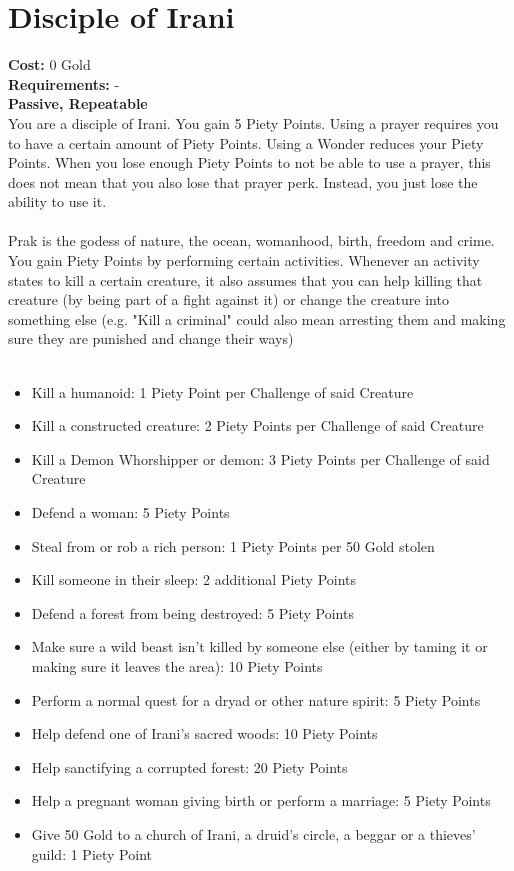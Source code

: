 \section{Disciple of Irani}
\textbf{Cost:} 0 Gold\\
\textbf{Requirements:} - \\
\textbf{Passive, Repeatable}\\
You are a disciple of Irani. You gain 5 Piety Points. Using a prayer requires you to have a certain amount of Piety Points. Using a Wonder reduces your Piety Points. When you lose enough Piety Points to not be able to use a prayer, this does not mean that you also lose that prayer perk. Instead, you just lose the ability to use it.\\
\\
Prak is the godess of nature, the ocean, womanhood, birth, freedom and crime. You gain Piety Points by performing certain activities. Whenever an activity states to kill a certain creature, it also assumes that you can help killing that creature (by being part of a fight against it) or change the creature into something else (e.g. "Kill a criminal" could also mean arresting them and making sure they are punished and change their ways)\\
\\
\begin{itemize}
	\item Kill a humanoid: 1 Piety Point per Challenge of said Creature
	\item Kill a constructed creature: 2 Piety Points per Challenge of said Creature
	\item Kill a Demon Whorshipper or demon: 3 Piety Points per Challenge of said Creature
	\item Defend a woman: 5 Piety Points
	\item Steal from or rob a rich person: 1 Piety Points per 50 Gold stolen
	\item Kill someone in their sleep: 2 additional Piety Points
	\item Defend a forest from being destroyed: 5 Piety Points
	\item Make sure a wild beast isn't killed by someone else (either by taming it or making sure it leaves the area): 10 Piety Points
	\item Perform a normal quest for a dryad or other nature spirit: 5 Piety Points
	\item Help defend one of Irani's sacred woods: 10 Piety Points
	\item Help sanctifying a corrupted forest: 20 Piety Points
	\item Help a pregnant woman giving birth or perform a marriage: 5 Piety Points
	\item Give 50 Gold to a church of Irani, a druid's circle, a beggar or a thieves' guild: 1 Piety Point
\end{itemize}

